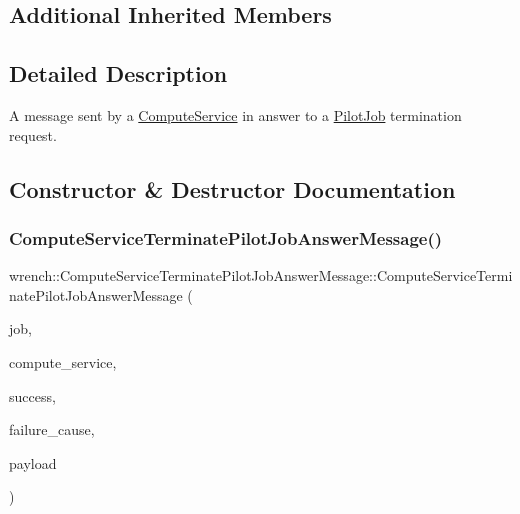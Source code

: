 \subsection*{Additional Inherited Members}


\subsection{Detailed Description}
A message sent by a \hyperlink{classwrench_1_1_compute_service}{Compute\+Service} in answer to a \hyperlink{classwrench_1_1_pilot_job}{Pilot\+Job} termination request. 

\subsection{Constructor \& Destructor Documentation}
\mbox{\label{classwrench_1_1_compute_service_terminate_pilot_job_answer_message_a6aea586c71a440ed3eede569ea31cec6}} 
\subsubsection{\texorpdfstring{Compute\+Service\+Terminate\+Pilot\+Job\+Answer\+Message()}{ComputeServiceTerminatePilotJobAnswerMessage()}}
{\footnotesize\ttfamily wrench\+::\+Compute\+Service\+Terminate\+Pilot\+Job\+Answer\+Message\+::\+Compute\+Service\+Terminate\+Pilot\+Job\+Answer\+Message (\begin{DoxyParamCaption}\item[{\hyperlink{classwrench_1_1_pilot_job}{Pilot\+Job} $\ast$}]{job,  }\item[{\hyperlink{classwrench_1_1_compute_service}{Compute\+Service} $\ast$}]{compute\+\_\+service,  }\item[{bool}]{success,  }\item[{std\+::shared\+\_\+ptr$<$ \hyperlink{classwrench_1_1_failure_cause}{Failure\+Cause} $>$}]{failure\+\_\+cause,  }\item[{double}]{payload }\end{DoxyParamCaption})}



